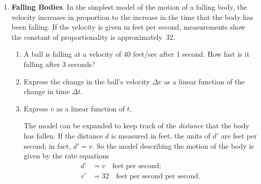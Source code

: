 \begin{enumerate}
  \begin{enumerate}
  \item How long is the bar when the temperature is 60$^\circ$F?
100$^\circ$F?

  \item What is the multiplier that connects an increase in length
$\Delta L$ to an increase in temperature $\Delta T$?

  \item Express $\Delta L$ as a linear function of $\Delta T$.

  \item How long will the bar be when $T = 0^\circ$F?

  \item Express $L$ as a linear function of $T$.

  \item What temperature change would make $L$ = 100.01 inches?

  \item For a {\em steel\/} bar that is also 100 inches long when the
temperature is 40$^\circ$ F, the relation between $\Delta L$ and
$\Delta T$ is $\Delta L = .00067 \, \Delta T$.  Which expands more
when the temperature is increased; aluminum or steel?

  \item How long will this steel bar be when $T = 80^\circ$F?


\end{enumerate}
\item {\bf Falling Bodies}\label{`falling'}.  In the simplest model of
the motion of a falling body, the velocity increases in proportion to
the increase in the time that the body has been falling.  If the
velocity is given in feet per second, measurements show the constant
of proportionality is approximately~32.

  \begin{enumerate}
  \item A ball is falling at a velocity of 40 feet/sec after 1 second.
How fast is it falling after 3 seconds?

  \item Express the change in the ball's velocity $\Delta v$ as a linear
function of the change in time $\Delta t$.

  \item Express $v$ as a linear function of $t$.


The model can be expanded to keep track of the {\em distance\/} that
the body has fallen.  If the distance $d$ is measured in feet, the
units of $d'$ are feet per second; in fact, $d'=v$.  So the model
describing the motion of the body is given by the rate equations
\begin{align*}
	d' &= v  \quad \mbox{feet per second};\\
	v' &= 32 \quad \mbox{feet per second per second}.
\end{align*}



\end{enumerate}
\end{enumerate}
